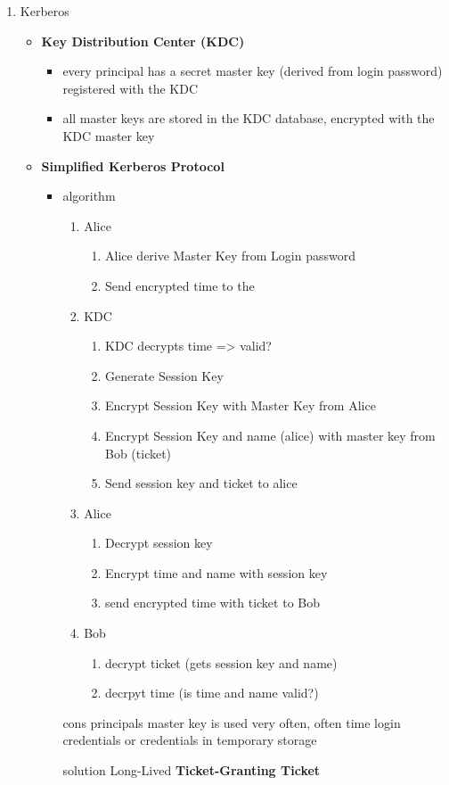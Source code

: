 \documentclass[11pt,twoside,landscape]{article}
\begin{document}
\begin{multicols}{4}
\begin{enumerate}
\item Kerberos
\label{sec:orgbe8d77a}
\begin{itemize}
\item \textbf{Key Distribution Center (KDC)}
\begin{itemize}
\item every principal has a secret master key (derived from login password) registered with the KDC
\item all master keys are stored in the KDC database, encrypted with the KDC master key
\end{itemize}

\item \textbf{Simplified Kerberos Protocol}
\begin{itemize}
\item algorithm 
\begin{enumerate}
\item Alice
\begin{enumerate}
\item Alice derive Master Key from Login password
\item Send encrypted time to the
\end{enumerate}
\item KDC
\begin{enumerate}
\item KDC decrypts time => valid?
\item Generate Session Key
\item Encrypt Session Key with Master Key from Alice
\item Encrypt Session Key and name (alice) with master key from Bob (ticket)
\item Send session key and ticket to alice
\end{enumerate}
\item Alice
\begin{enumerate}
\item Decrypt session key
\item Encrypt time and name with session key
\item send encrypted time with ticket to Bob
\end{enumerate}
\item Bob
\begin{enumerate}
\item decrypt ticket (gets session key and name)
\item decrpyt time (is time and name valid?)
\end{enumerate}
\end{enumerate}
\item[{cons}] principals master key is used very often, often time login credentials or credentials in temporary storage
\item[{solution}] Long-Lived \textbf{Ticket-Granting Ticket}
\end{itemize}


\end{itemize}
\end{enumerate}
\end{multicols}
\end{document}
